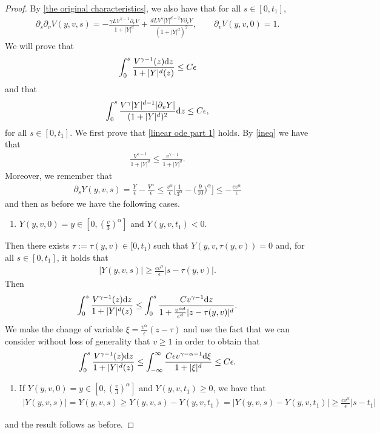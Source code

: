 \documentclass[11pt]{article}
\numberwithin{equation}{section}
\newcommand{\der}{\textup{d}}
\begin{document}
\begin{proof}
By \eqref{the original characteristics}, we also have that for all $s\in[0,t_{1}]$,
\begin{align}\label{der v v}
    \partial_{s}\partial_{v}V(y,v,s)=-\frac{\gamma L V^{\gamma-1}\partial_{v}V}{1+|Y|^{d}}+\frac{d L V^{\gamma}|Y|^{d-2}Y\partial_{v}Y}{(1+|Y|^{d})^{2}}, \qquad \partial_{v}V(y,v,0)=1.
\end{align}
We will prove that 
\begin{align}\label{linear ode part 1}
    \int_{0}^{s}\frac{ V^{\gamma-1}(z)\der z}{1+|Y|^{d}(z)}\leq C\epsilon
\end{align}
and that 
\begin{align}\label{linear ode part 2}
    \int_{0}^{s}\frac{V^{\gamma}|Y|^{d-1}|\partial_{v}Y|}{(1+|Y|^{d})^{2}}\der z \leq C\epsilon,
\end{align}
for all $s\in[0,t_{1}]$. We first prove that \eqref{linear ode part 1} holds. By \eqref{ineq} we have that
\begin{align*}
   \frac{V^{\gamma-1}}{1+|Y|^{d}}\leq \frac{ v^{\gamma-1}}{1+|Y|^{d}}.
\end{align*}
Moreover, we remember that 
\begin{align*}
    \partial_{s}Y(y,v,s)=\frac{Y}{\epsilon}-\frac{V^{\alpha}}{\epsilon}\leq \frac{v^{\alpha}}{\epsilon}\bigg[\frac{1}{3^{\alpha}}-\Big(\frac{9}{10}\Big)^{\alpha}\bigg]\leq -\frac{c v^{\alpha}}{\epsilon}
\end{align*}
and then as before we have the following cases. \begin{enumerate}\item[i)]  $Y(y,v,0)=y\in[0,(\frac{v}{3})^{\alpha}]$ and $Y(y,v,t_{1})< 0$.
\end{enumerate}
Then there exists $\tau:=\tau(y,v)\in[0,t_{1})$ such that $Y(y,v,\tau(y,v))=0$ and, for all $s\in[0,t_{1}]$, it holds that
\begin{align}\label{linear bound for y}
 |Y(y,v,s)|\geq \frac{c v^{\alpha}}{\epsilon}|s- \tau(y,v)|.
\end{align}
Then 
\begin{align*}
        \int_{0}^{s}\frac{ V^{\gamma-1}(z)\der z}{1+|Y|^{d}(z)}\leq      \int_{0}^{s}\frac{ Cv^{\gamma-1}\der z}{1+ \frac{ v^{\alpha d}}{\epsilon^{d}}|z- \tau(y,v)|^{d}}.
\end{align*}
We make the change of variable $\xi=\frac{v^{\alpha}}{\epsilon}(z-\tau)$ and use the fact that we can consider without loss of generality that $v\geq 1$ in order to obtain that
\begin{align*}
        \int_{0}^{s}\frac{ V^{\gamma-1}(z)\der z}{1+|Y|^{d}(z)}\leq      \int_{-\infty}^{\infty}\frac{ C\epsilon v^{\gamma-\alpha-1}\der \xi}{1+ |\xi|^{d}}\leq C \epsilon.
\end{align*}
\begin{enumerate}
    \item[ii)]If $Y(y,v,0)=y\in[0,(\frac{v}{3})^{\alpha}]$ and $Y(y,v,t_{1})\geq 0$, we have that \begin{align*}
    |Y(y,v,s)|=Y(y,v,s)\geq Y(y,v,s)-Y(y,v,t_{1})=|Y(y,v,s)-Y(y,v,t_{1})|\geq \frac{c v^{\alpha}}{\epsilon}|s- t_{1}|
\end{align*}\end{enumerate}and the result follows as before. 


\end{proof}
\end{document}
